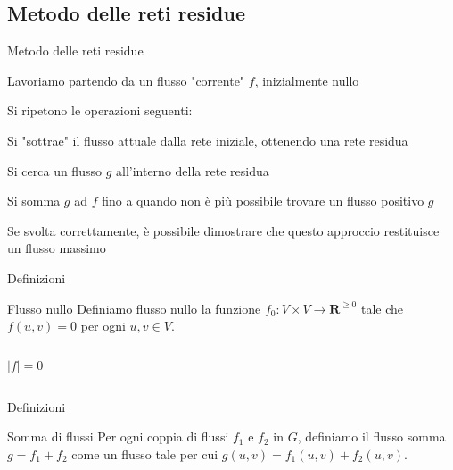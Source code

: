 \subsection{Metodo delle reti residue}


\begin{frame}{Metodo delle reti residue}

\vspace{-6pt}
\BIL
\item Lavoriamo partendo da un flusso "corrente" $f$, inizialmente nullo
\item Si ripetono le operazioni seguenti:
  \BIL
  \item Si "sottrae" il flusso attuale dalla rete iniziale, ottenendo una
    rete residua
  \item Si cerca un flusso $g$ all'interno della rete residua
  \item Si somma $g$ ad $f$
  \EIL
  fino a quando non è più possibile trovare un flusso positivo $g$
\EIL

\smallskip
{}
Se svolta correttamente, è possibile dimostrare che questo approccio restituisce
un flusso massimo

\end{frame}



\begin{frame}{Definizioni}

\vspace{-9pt}
\begin{block}{Flusso nullo}
Definiamo \alert{flusso nullo} la funzione 
$f_0: V \times V \rightarrow \mathbf{R}^{\geq 0}$ tale che
$f(u,v) = 0$ per ogni $u,v \in V$.
\end{block}

\bigskip
\begin{columns}[T]
\[|f| = 0\]
\vspace{-12pt}
\end{columns}

\end{frame}


\begin{frame}{Definizioni}

\vspace{-9pt}
\begin{block}{Somma di flussi}
Per ogni coppia di flussi $f_1$ e $f_2$ in $G$, definiamo il \alert{flusso somma}
$g = f_1+f_2$ come un flusso tale per cui $g(u,v) = f_1(u,v) + f_2(u,v)$.
\end{block}


\end{frame}


